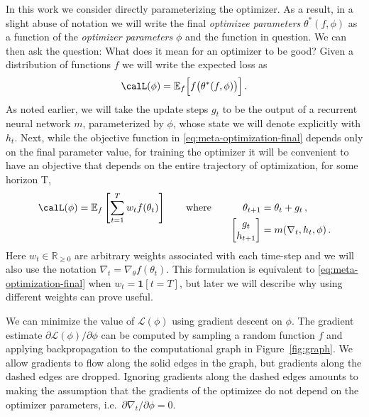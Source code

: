 \documentclass{article}
\begin{document}
In this work we consider directly parameterizing the optimizer. As a result, in
a slight abuse of notation we will write the final \emph{optimizee parameters}
$\theta^*(f, \phi)$ as a function of the \emph{optimizer parameters} $\phi$ and
the function in question. We can then ask the question: What does it mean for
an optimizer to be good? Given a distribution of functions $f$ we will write
the expected loss as
\begin{equation}
    \calL(\phi) =
    \mathbb{E}_{f} \Big[ f\big(\theta^*(f, \phi)\big) \Big] \,.
    \label{eq:meta-optimization-final}
\end{equation}
As noted earlier, we will take the update steps $g_t$ to be the output of a
recurrent neural network $m$, parameterized by $\phi$, whose
state we will denote explicitly with $h_t$. Next, while the objective function
in \eqref{eq:meta-optimization-final} depends only on the final parameter
value, for training the optimizer it will be convenient to have an objective
that depends on the entire trajectory of optimization, for some horizon T,
\begin{equation}
    \calL(\phi)
    = \mathbb{E}_{f} \left[\sum_{t=1}^T w_t f(\theta_t)\right]
    \qquad\text{where}\qquad
    \begin{aligned}[t]
        \theta_{t+1} &= \theta_t + g_t \,,
        \\
        \begin{bmatrix}
            g_t \\ h_{t+1}
        \end{bmatrix}
        &= m(\nabla_t, h_t, \phi) \,.
    \end{aligned}
    \label{eq:meta-optimization}
\end{equation}
Here $w_t \in \mathbb{R}_{\ge 0}$ are arbitrary weights associated with each
time-step and we will also use the notation $\nabla_t=\nabla_\theta
f(\theta_t)$. This formulation is equivalent to
\eqref{eq:meta-optimization-final} when $w_t = \boldsymbol{1}[t = T]$,
but later we will describe why using different weights can prove useful.

We can minimize the value of $\mathcal{L}(\phi)$ using gradient descent on
$\phi$. 
The gradient estimate
$\partial\mathcal{L(\phi)}/\partial\phi$ can be computed by sampling a random
function $f$ and applying backpropagation to the computational graph in
Figure~\ref{fig:graph}.  We allow gradients to flow along the solid edges in
the graph, but gradients along the dashed edges are dropped.  Ignoring
gradients along the dashed edges amounts to making the assumption that the
gradients of the optimizee do not depend on the optimizer parameters, i.e.\
$\partial \nabla_{t}\big/\partial\phi = 0$.
\end{document}
